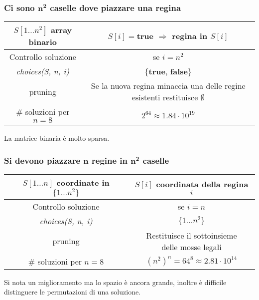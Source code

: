 \subsubsection{Ci sono $\mathbf{n^2}$ caselle dove piazzare una regina}
\begin{center}
\begin{tabular}{|c|c|}
	\hline
	$S[1\dots n^2]$ array binario & $S[i]=$\textbf{true} $\Rightarrow$ regina in $S[i]$ \\
	\hline
	Controllo soluzione & se $i = n^2$ \\
	\hline
	\emph{choices(S, n, i)} & $\{$\textbf{true}, \textbf{false}$\}$\\
	\hline
	pruning & \makecell{Se la nuova regina minaccia una delle \\regine esistenti restituisce $\emptyset$}\\
	\hline
	$\#$ soluzioni per $n=8$ & $2^{64}\approx 1.84\cdot 10^{19}$\\
	\hline
\end{tabular}
\end{center}
La matrice binaria \`e molto sparsa.
\subsubsection{Si devono piazzare $\mathbf{n}$ regine in $\mathbf{n^2}$ caselle}
\begin{center}
\begin{tabular}{|c|c|}
	\hline
	$S[1\dots n]$ coordinate in $\{1\dots n^2\}$ & $S[i]$ coordinata della regina $i$\\
	\hline
	Controllo soluzione & se $i = n$ \\
	\hline
	\emph{choices(S, n, i)} & $\{1\dots n^2\}$\\
	\hline
	pruning & \makecell{Restituisce il sottoinsieme\\ delle mosse legali}\\
	\hline
	$\#$ soluzioni per $n=8$ & $(n^2)^n = 64^{8}\approx 2.81\cdot 10^{14}$\\
	\hline
\end{tabular}
\end{center}
Si nota un miglioramento ma lo spazio \`e ancora grande, inoltre \`e difficile distinguere le permutazioni di una soluzione.
